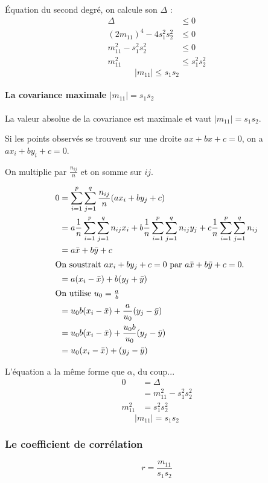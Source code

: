 Équation du second degré, on calcule son $\Delta$ :
\begin{align*}
	\Delta &\leq 0\\
	(2 m_{11})^4 - 4 s_1^2 s_2^2 &\leq 0\\
	m_{11}^2 - s_1^2 s_2^2 &\leq 0\\
	m_{11}^2 &\leq s_1^2 s_2^2
\end{align*}
$$\boxed{|m_{11}| \leq s_1 s_2}$$




\paragraph{La covariance maximale $|m_{11}| = s_1s_2$}

La valeur absolue de la covariance est maximale et vaut $|m_{11}| = s_1s_2$.

Si les points observés se trouvent sur une droite $ax+bx+c=0$, on a $ax_i+by_i+c=0$.

On multiplie par $\frac{n_{ij}}{n}$ et on somme sur $ij$.

\begin{align*}
0  &= \sum_{i=1}^{p} \sum_{j=1}^{q} \frac{n_{ij}}{n}(ax_i+by_j+c) \\
   &= a \frac{1}{n} \sum_{i=1}^{p} \sum_{j=1}^{q}n_{ij}x_i + b \frac{1}{n} \sum_{i=1}^{p} \sum_{j=1}^{q}n_{ij}y_j + c \frac{1}{n} \sum_{i=1}^{p} \sum_{j=1}^{q}n_{ij}\\
   &= a\bar{x}+b\bar{y}+c\\
\intertext{On soustrait $ax_i+by_j+c=0$ par $a\bar{x}+b\bar{y}+c = 0$.}
   &= a(x_i-\bar{x})+b(y_j+\bar{y})\\
\intertext{On utilise $u_0=\frac{a}{b}$}
   &= u_0b(x_i-\bar{x})+\frac{a}{u_0}(y_j-\bar{y})\\
   &= u_0b(x_i-\bar{x})+\frac{u_0b}{u_0}(y_j-\bar{y})\\
   &= u_0(x_i-\bar{x})+(y_j-\bar{y})
\end{align*}

L'équation a la même forme que $\alpha$, du coup...
\begin{align*}
	0        &= \Delta\\
	         &= m_{11}^2-s_1^2s_2^2\\
	m_{11}^2 &= s_1^2s_2^2
\end{align*}
$$|m_{11}| = s_1s_2$$




\subsubsection{Le coefficient de corrélation}
$$\boxed{r=\frac{m_{11}}{s_1s_2}}$$

